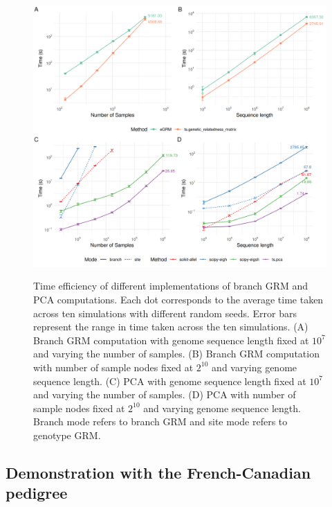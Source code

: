 \begin{figure}
    \centering
    \includegraphics[width=\textwidth]{Figures/Fig2_benchmarking_plot.png}
    \label{fig:benchmarking}
    \caption{Time efficiency of different implementations of branch GRM and PCA computations.
    Each dot corresponds to the average time taken across ten simulations with different random seeds.
    Error bars represent the range in time taken across the ten simulations.
    (A) Branch GRM computation with genome sequence length fixed at $10^{7}$ and varying the number of samples.
    (B) Branch GRM computation with number of sample nodes fixed at $2^{10}$ and varying genome sequence length.
    (C) PCA with genome sequence length fixed at $10^{7}$ and varying the number of samples.
    (D) PCA with number of sample nodes fixed at $2^{10}$ and varying genome sequence length.
    Branch mode refers to branch GRM and site mode refers to genotype GRM.}
\end{figure}


\subsection{Demonstration with the French-Canadian pedigree}

